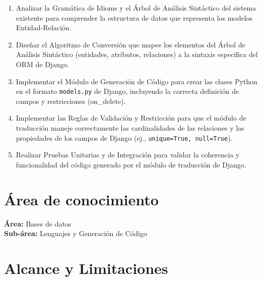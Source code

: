 \begin{enumerate}
    \item Analizar la Gramática de Idioms y el Árbol de Análisis Sintáctico del sistema existente para comprender la estructura de datos que representa los modelos Entidad-Relación.
    \item Diseñar el Algoritmo de Conversión que mapee los elementos del Árbol de Análisis Sintáctico (entidades, atributos, relaciones) a la sintaxis específica del ORM de Django.
    \item Implementar el Módulo de Generación de Código para crear las clases Python en el formato \texttt{models.py} de Django, incluyendo la correcta definición de campos y restricciones (on\_delete).
    \item Implementar las Reglas de Validación y Restricción para que el módulo de traducción maneje correctamente las cardinalidades de las relaciones y las propiedades de los campos de Django (ej., \texttt{unique=True, null=True}).
    \item Realizar Pruebas Unitarias y de Integración para validar la coherencia y funcionalidad del código generado por el módulo de traducción de Django.
\end{enumerate}

\section{Área de conocimiento}
\label{sec:area}
\textbf{Área:} Bases de datos\\
\textbf{Sub-área:} Lenguajes y Generación de Código

\section{Alcance y Limitaciones}
\label{sec:alcance-limitaciones}

